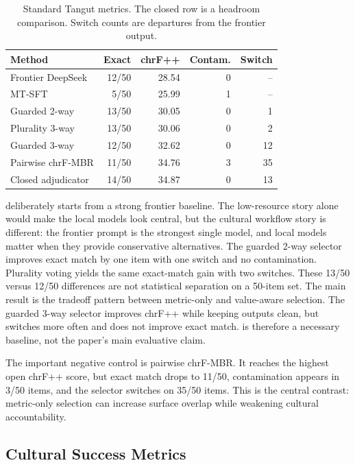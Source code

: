 \documentclass{article}
\begin{document}
\begin{table}[t]
\centering
\scriptsize
\begin{tabularx}{\columnwidth}{@{}Xrrrr@{}}
\toprule
Method & Exact & chrF++ & Contam. & Switch \\
\midrule
Frontier DeepSeek & 12/50 & 28.54 & 0 & -- \\
MT-SFT & 5/50 & 25.99 & 1 & -- \\
Guarded 2-way & 13/50 & 30.05 & 0 & 1 \\
Plurality 3-way & 13/50 & 30.06 & 0 & 2 \\
Guarded 3-way & 12/50 & 32.62 & 0 & 12 \\
Pairwise chrF-MBR & 11/50 & 34.76 & 3 & 35 \\
Closed adjudicator & 14/50 & 34.87 & 0 & 13 \\
\bottomrule
\end{tabularx}
\caption{Standard Tangut metrics. The closed row is a headroom comparison. Switch counts are departures from the frontier output.}
\label{tab:standard}
\end{table}

 deliberately starts from a strong frontier baseline. The low-resource story alone would make the local models look central, but the cultural workflow story is different: the frontier prompt is the strongest single model, and local models matter when they provide conservative alternatives. The guarded 2-way selector improves exact match by one item with one switch and no contamination. Plurality voting yields the same exact-match gain with two switches. These 13/50 versus 12/50 differences are not statistical separation on a 50-item set. The main result is the tradeoff pattern between metric-only and value-aware selection. The guarded 3-way selector improves chrF++ while keeping outputs clean, but switches more often and does not improve exact match.  is therefore a necessary baseline, not the paper's main evaluative claim.

The important negative control is pairwise chrF-MBR. It reaches the highest open chrF++ score, but exact match drops to 11/50, contamination appears in 3/50 items, and the selector switches on 35/50 items. This is the central contrast: metric-only selection can increase surface overlap while weakening cultural accountability.

\subsection{Cultural Success Metrics}
\end{document}
